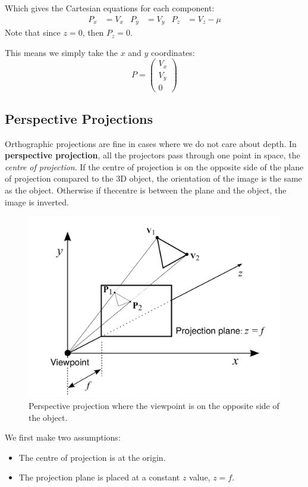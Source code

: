 \documentclass[11pt]{article}
\begin{document}
Which gives the Cartesian equations for each component:
\begin{align*}
  P_x &= V_x  & P_y &= V_y & P_z &= V_z - \mu
\end{align*}
Note that since $z = 0$, then $P_z = 0$.

This means we simply take the $x$ and $y$ coordinates:
\[
  P =
  \begin{pmatrix}
    V_x \\
    V_y \\
    0
  \end{pmatrix}
\]

\subsection{Perspective Projections}
Orthographic projections are fine in cases where we do not care about depth.
In \textbf{perspective projection}, all the projectors pass through one point in space, the \textit{centre of projection}.
If the centre of projection is on the opposite side of the plane of projection compared to the 3D object, the orientation of the image is the same as the object.
Otherwise if thecentre is between the plane and the object, the image is inverted.

\begin{figure}[htb!]
  \caption{Perspective projection where the viewpoint is on the opposite side of the object.}
  \includegraphics[scale=0.3]{perspective}
  \centering
\end{figure}

We first make two assumptions:
\begin{itemize}
  \item The centre of projection is at the origin.
  \item The projection plane is placed at a constant $z$ value, $z = f$.
\end{itemize}
\end{document}
